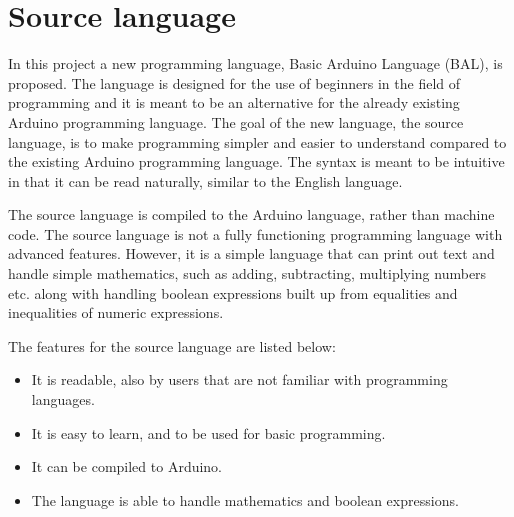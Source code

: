 \chapter{Source language}\label{analysis:source-language}
In this project a new programming language, Basic Arduino Language (BAL), is proposed. The language is designed for the use of beginners in the field of programming and it is meant  to be an alternative for the already existing Arduino programming language.
The goal of the new language, the source language, is to make programming simpler and easier to understand compared to the existing Arduino programming language. The syntax is meant to be intuitive in that it can be read naturally, similar to the English language.

The source language is compiled to the Arduino language, rather than machine code. The source language is not a fully functioning programming language with advanced features. However, it is a simple language that can print out text and handle simple mathematics, such as adding, subtracting, multiplying numbers etc. along with handling boolean expressions built up from equalities and inequalities of numeric expressions.

The features for the source language are listed below:
\begin{itemize}
	\item It is readable, also by users that are not familiar with programming languages.
	\item It is easy to learn, and to be used for basic programming.
	\item It can be compiled to Arduino.
	\item The language is able to handle mathematics and boolean expressions.
\end{itemize}